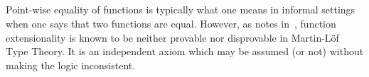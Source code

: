 \documentclass[a4paper,UKenglish,cleveref,autoref,thm-restate,11pt]{lipics-v2021}
\begin{document}
\begin{code}
\>[0]\AgdaSpace{}%
\AgdaSymbol{:}\AgdaSpace{}%
\AgdaSymbol{(}\AgdaSpace{}%
\AgdaSpace{}%
\AgdaSymbol{:}\AgdaSpace{}%
\AgdaSymbol{)}\AgdaSpace{}%
\AgdaSpace{}%
\AgdaSymbol{(}\AgdaSpace{}%
\AgdaSpace{}%
\AgdaSymbol{)}%
\<%
\\
\>[0]\AgdaSpace{}%
\AgdaSpace{}%
\AgdaSpace{}%
\AgdaSymbol{=}\AgdaSpace{}%
\AgdaSymbol{\{}\AgdaSpace{}%
\AgdaSymbol{:}\AgdaSpace{}%
\AgdaSpace{}%
\AgdaSpace{}%
\AgdaSymbol{\}}\AgdaSpace{}%
\AgdaSymbol{\{}\AgdaSpace{}%
\AgdaSymbol{:}\AgdaSpace{}%
\AgdaSpace{}%
\AgdaSpace{}%
\AgdaSymbol{\}}\AgdaSpace{}%
\AgdaSymbol{\{}\AgdaSpace{}%
\AgdaSpace{}%
\AgdaSymbol{:}\AgdaSpace{}%
\AgdaSpace{}%
\AgdaSpace{}%
\AgdaSymbol{\}}\AgdaSpace{}%
\AgdaSpace{}%
\AgdaSpace{}%
\AgdaSpace{}%
\AgdaSpace{}%
\AgdaSpace{}%
\AgdaSpace{}%
\AgdaSpace{}%
\<%
\\
\\
\>[0]\AgdaSpace{}%
\AgdaSymbol{:}\AgdaSpace{}%
\AgdaSymbol{(}\AgdaSpace{}%
\AgdaSpace{}%
\AgdaSymbol{:}\AgdaSpace{}%
\AgdaSymbol{)}\AgdaSpace{}%
\AgdaSpace{}%
\AgdaSymbol{(}\AgdaSpace{}%
\AgdaSpace{}%
\AgdaSymbol{)}\AgdaSpace{}%
\<%
\\
\>[0]\AgdaSpace{}%
\AgdaSpace{}%
\AgdaSpace{}%
\AgdaSymbol{=}\AgdaSpace{}%
\AgdaSymbol{\{}\AgdaSpace{}%
\AgdaSymbol{:}\AgdaSpace{}%
\AgdaSpace{}%
\AgdaSpace{}%
\AgdaSymbol{\}}\AgdaSpace{}%
\AgdaSymbol{\{}\AgdaSpace{}%
\AgdaSymbol{:}\AgdaSpace{}%
\AgdaSpace{}%
\AgdaSpace{}%
\AgdaSpace{}%
\AgdaSpace{}%
\AgdaSymbol{\}}\AgdaSpace{}%
\AgdaSymbol{\{}\AgdaSpace{}%
\AgdaSpace{}%
\AgdaSymbol{:}\AgdaSpace{}%
\AgdaSpace{}%
\AgdaSymbol{\}}\AgdaSpace{}%
\AgdaSpace{}%
\AgdaSpace{}%
\AgdaSpace{}%
\AgdaSpace{}%
\AgdaSpace{}%
\AgdaSpace{}%
\AgdaSpace{}%
\<%
\end{code}
\ccpad
Point-wise equality of functions is typically what one means in informal settings when one says that two functions are equal. However, as \escardo notes in~\cite{MHE}, function extensionality is known to be neither provable nor disprovable in Martin-Löf Type Theory. It is an independent axiom which may be assumed (or not) without making the logic inconsistent.
\end{document}
